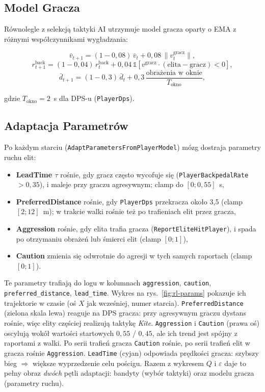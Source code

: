 
\subsection{Model Gracza}

Równolegle z selekcją taktyki AI utrzymuje model gracza oparty o EMA z różnymi współczynnikami wygładzania:

\[
    \bar v_{t+1} = (1-0{,}08)\,\bar v_t + 0{,}08\, \|v^\text{gracz}_t\|,
\]
\[
    r^\text{back}_{t+1} = (1-0{,}04)\, r^\text{back}_t + 0{,}04\,\mathbb{1}[v^\text{gracz} \cdot (\text{elita}-\text{gracz}) < 0],
\]
\[
    \bar d_{t+1} = (1-0{,}3)\, \bar d_t + 0{,}3\, \frac{\text{obrażenia w oknie}}{T_\text{okno}},
\]

gdzie $T_\text{okno} = 2$~s dla DPS-u (\texttt{PlayerDps}).

\subsection{Adaptacja Parametrów}

Po każdym starciu (\texttt{AdaptParametersFromPlayerModel}) mózg dostraja parametry ruchu elit:

\begin{itemize}
    \item \textbf{LeadTime $\tau$} rośnie, gdy gracz często wycofuje się (\texttt{PlayerBackpedalRate} $> 0{,}35$), i maleje przy graczu agresywnym; clamp do $[0; 0{,}55]$~s,
    \item \textbf{PreferredDistance} rośnie, gdy \texttt{PlayerDps} przekracza około 3,5 (clamp $[2; 12]$~m); w trakcie walki rośnie też po trafieniach elit przez gracza,
    \item \textbf{Aggression} rośnie, gdy elita trafia gracza (\texttt{ReportEliteHitPlayer}), i spada po otrzymaniu obrażeń lub śmierci elit (clamp $[0; 1]$),
    \item \textbf{Caution} zmienia się odwrotnie do agresji w tych samych raportach (clamp $[0; 1]$).
\end{itemize}

Te parametry trafiają do logu w kolumnach \texttt{aggression}, \texttt{caution}, \texttt{preferred\_distance}, \texttt{lead\_time}. Wykres na rys.~\ref{fig:rl-params} pokazuje ich trajektorie w czasie (oś $X$ jak wcześniej, numer starcia). \texttt{PreferredDistance} (zielona skala lewa) reaguje na DPS gracza: przy agresywnym graczu dystans rośnie, więc elity częściej realizują taktykę \textit{Kite}. \texttt{Aggression} i \texttt{Caution} (prawa oś) oscylują wokół wartości startowych $0{,}55$ / $0{,}45$, ale ich trend jest spójny z raportami z walki. Po serii trafień gracza \texttt{Caution} rośnie, po serii trafień elit w gracza rośnie \texttt{Aggression}. \texttt{LeadTime} (cyjan) odpowiada prędkości gracza: szybszy bieg $\Rightarrow$ większe wyprzedzenie celu pościgu. Razem z wykresem $Q$ i $\varepsilon$ daje to pełny obraz \emph{dwóch} pętli adaptacji: bandyty (wybór taktyki) oraz modelu gracza (parametry ruchu).

